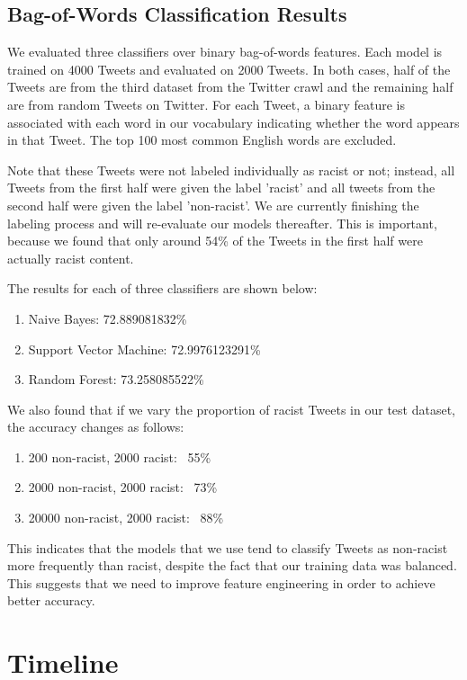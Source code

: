 \documentclass[]{article}
\begin{document}
\subsection{Bag-of-Words Classification Results}

We evaluated three classifiers over binary bag-of-words features. Each model is trained on 4000 Tweets and evaluated on 2000 Tweets. In both cases, half of the Tweets are from the third dataset from the Twitter crawl and the remaining half are from random Tweets on Twitter. For each Tweet, a binary feature is associated with each word in our vocabulary indicating whether the word appears in that Tweet. The top 100 most common English words are excluded.

Note that these Tweets were not labeled individually as racist or not; instead, all Tweets from the first half were given the label 'racist' and all tweets from the second half were given the label 'non-racist'. We are currently finishing the labeling process and will re-evaluate our models thereafter. This is important, because we found that only around 54\% of the Tweets in the first half were actually racist content.

The results for each of three classifiers are shown below:

\begin{enumerate}
\item Naive Bayes: 72.889081832\%
\item Support Vector Machine: 72.9976123291\%
\item Random Forest: 73.258085522\%
\end{enumerate}


We also found that if we vary the proportion of racist Tweets in our test dataset, the accuracy changes as follows:

\begin{enumerate}
\item 200 non-racist, 2000 racist: ~55\%
\item 2000 non-racist, 2000 racist: ~73\%
\item 20000 non-racist, 2000 racist: ~88\%
\end{enumerate}

This indicates that the models that we use tend to classify Tweets as non-racist more frequently than racist, despite the fact that our training data was balanced. This suggests that we need to improve feature engineering in order to achieve better accuracy.

\section{Timeline}
\end{document}
